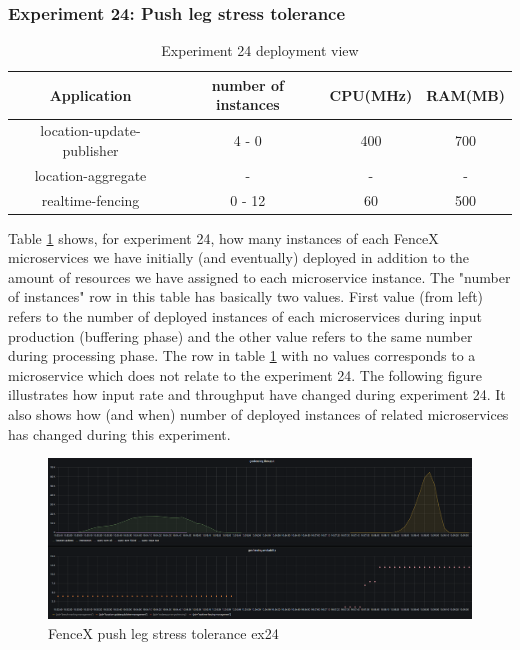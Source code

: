 \documentclass[a4]{report}
\begin{document}
    \subsubsection{Experiment 24: Push leg stress tolerance}
    \begin{table}[h!]
        \centering
        \begin{tabular}{|c|c|c|c|}
            \hline
            Application               & number of instances & CPU(MHz) & RAM(MB) \\
            \hline
            location-update-publisher & 4 - 0               & 400      & 700     \\
            location-aggregate        & -                   & -        & -       \\
            realtime-fencing          & 0 - 12              & 60       & 500     \\
            \hline
        \end{tabular}
        \caption{Experiment 24 deployment view}
        \label{table:ex24-dv}
    \end{table}

    Table \ref{table:ex24-dv} shows, for experiment 24, how many instances of each FenceX microservices we have
    initially (and eventually) deployed in addition to the amount of resources we have assigned to each microservice
    instance.
    The "number of instances" row in this table has basically two values.
    First value (from left) refers to the number of deployed instances of each microservices during input production
    (buffering phase) and the other value refers to the same number during processing phase.
    The row in table \ref{table:ex24-dv} with no values corresponds to a microservice which does not relate to the
    experiment 24.
    The following figure illustrates how input rate and throughput have changed during experiment 24.
    It also shows how (and when) number of deployed instances of related microservices has changed during this
    experiment.

    \begin{figure}
        \centering
        \caption{FenceX push leg stress tolerance ex24}
        \label{fig:ex24}
        \includegraphics[width=\textwidth, height=0.3\textheight]{images/evaluation/ex24-benchmarking-ongoing-1per2sec.png}
    \end{figure}
\end{document}
